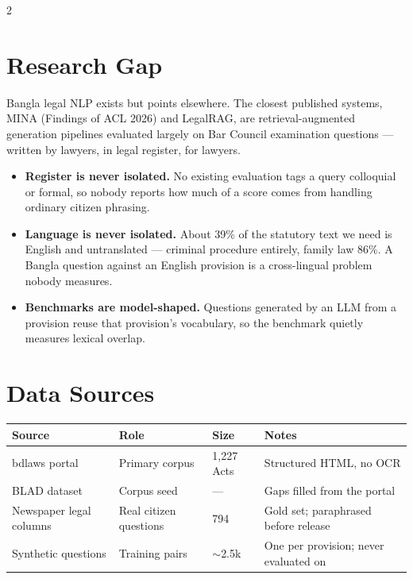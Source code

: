 \documentclass[11pt]{article}
\begin{document}
\begin{multicols}{2}
\section{Research Gap}
Bangla legal NLP exists but points elsewhere. The closest published systems, MINA (Findings of ACL 2026) and LegalRAG, are retrieval-augmented generation pipelines evaluated largely on Bar Council examination questions --- written by lawyers, in legal register, for lawyers.
\begin{itemize}
\item \textbf{Register is never isolated.} No existing evaluation tags a query colloquial or formal, so nobody reports how much of a score comes from handling ordinary citizen phrasing.
\item \textbf{Language is never isolated.} About 39\% of the statutory text we need is English and untranslated --- criminal procedure entirely, family law 86\%. A Bangla question against an English provision is a cross-lingual problem nobody measures.
\item \textbf{Benchmarks are model-shaped.} Questions generated by an LLM from a provision reuse that provision's vocabulary, so the benchmark quietly measures lexical overlap.
\end{itemize}

\section{Data Sources}
\vspace{2pt}
{\footnotesize
\setlength{\tabcolsep}{3pt}
\begin{tabular}{|p{1.55cm}|p{1.55cm}|p{0.85cm}|p{2.3cm}|}
\hline
\textbf{Source} & \textbf{Role} & \textbf{Size} & \textbf{Notes} \\
\hline
bdlaws portal & Primary corpus & 1,227 Acts & Structured HTML, no OCR \\
\hline
BLAD dataset & Corpus seed & --- & Gaps filled from the portal \\
\hline
Newspaper legal columns & Real citizen questions & 794 & Gold set; paraphrased before release \\
\hline
Synthetic questions & Training pairs & $\sim$2.5k & One per provision; never evaluated on \\
\hline
\end{tabular}
}


\end{multicols}
\end{document}
